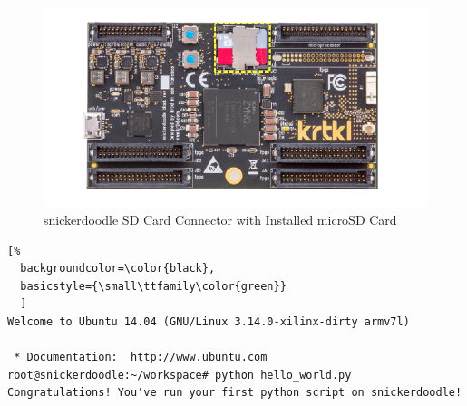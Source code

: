 \begin{figure}
	\centering
	\includegraphics{images/SD_microSD.pdf}
	\caption{snickerdoodle SD Card Connector with Installed microSD Card}
\end{figure}


\begin{fullwidth}
\begin{lstlisting}[%
  backgroundcolor=\color{black},
  basicstyle={\small\ttfamily\color{green}}
  ]
Welcome to Ubuntu 14.04 (GNU/Linux 3.14.0-xilinx-dirty armv7l)

 * Documentation:  http://www.ubuntu.com
root@snickerdoodle:~/workspace# python hello_world.py 
Congratulations! You've run your first python script on snickerdoodle!
\end{lstlisting}
\end{fullwidth}

